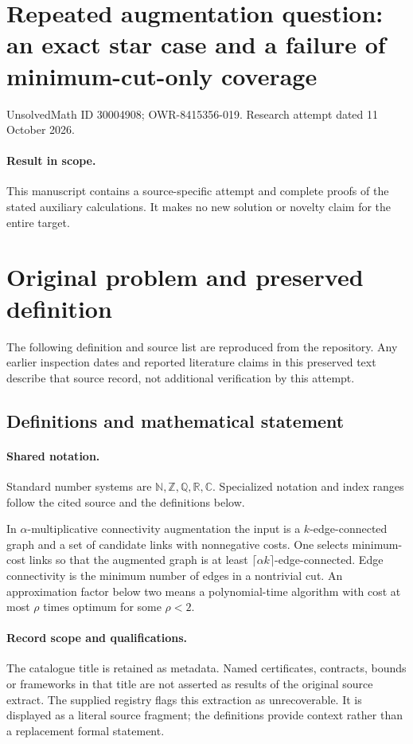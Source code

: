 \documentclass[11pt]{article}
\begin{document}
\section*{Repeated augmentation question: an exact star case and a failure of minimum-cut-only coverage}
\noindent UnsolvedMath ID 30004908; OWR-8415356-019. Research attempt dated 11 October 2026.
\paragraph{Result in scope.}This manuscript contains a source-specific attempt and complete proofs of the stated auxiliary calculations. It makes no new solution or novelty claim for the entire target.
\section{Original problem and preserved definition}
The following definition and source list are reproduced from the repository. Any earlier inspection dates and reported literature claims in this preserved text describe that source record, not additional verification by this attempt.
\subsection{Definitions and mathematical statement}

\paragraph{Shared notation.}Standard number systems are $\mathbb N,\mathbb Z,\mathbb Q,\mathbb R,\mathbb C$. Specialized notation and index ranges follow the cited source and the definitions below.


In $\alpha$-multiplicative connectivity augmentation the input is a $k$-edge-connected graph and a set of candidate links with nonnegative costs. One selects minimum-cost links so that the augmented graph is at least $\lceil\alpha k\rceil$-edge-connected. Edge connectivity is the minimum number of edges in a nontrivial cut. An approximation factor below two means a polynomial-time algorithm with cost at most $\rho$ times optimum for some $\rho<2$.
\paragraph{Record scope and qualifications.}
The catalogue title is retained as metadata. Named certificates, contracts, bounds or frameworks in that title are not asserted as results of the original source extract.
The supplied registry flags this extraction as unrecoverable. It is displayed as a literal source fragment; the definitions provide context rather than a replacement formal statement.
\end{document}
